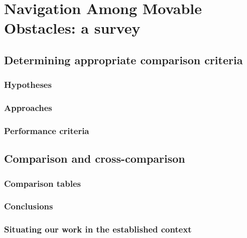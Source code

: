 
\chapter{Navigation Among Movable Obstacles: a survey} %

\label{Chapter2} %

\section{Determining appropriate comparison criteria}

\subsection{Hypotheses}

\subsection{Approaches}

\subsection{Performance criteria}

\section{Comparison and cross-comparison}

\subsection{Comparison tables}

\subsection{Conclusions}

\subsection{Situating our work in the established context}
